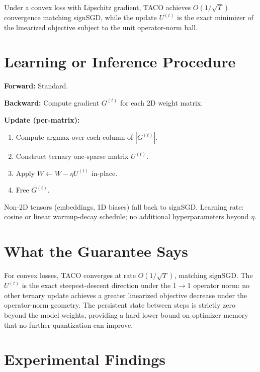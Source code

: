 \documentclass[10pt,twocolumn]{article}
\begin{document}
Under a convex loss with Lipschitz gradient, TACO achieves
$O(1/\sqrt{T})$ convergence matching signSGD, while the update $U^{(t)}$
is the exact minimizer of the linearized objective subject to the unit
operator-norm ball.

\section{Learning or Inference Procedure}

\textbf{Forward:} Standard.

\textbf{Backward:} Compute gradient $G^{(t)}$ for each 2D weight matrix.

\textbf{Update (per-matrix):}
\begin{enumerate}[itemsep=2pt,parsep=0pt]
  \item Compute argmax over each column of $|G^{(t)}|$.
  \item Construct ternary one-sparse matrix $U^{(t)}$.
  \item Apply $W \leftarrow W - \eta U^{(t)}$ in-place.
  \item Free $G^{(t)}$.
\end{enumerate}

Non-2D tensors (embeddings, 1D biases) fall back to signSGD.
Learning rate: cosine or linear warmup-decay schedule; no additional
hyperparameters beyond $\eta$.

\section{What the Guarantee Says}

For convex losses, TACO converges at rate $O(1/\sqrt{T})$, matching signSGD.
The $U^{(t)}$ is the exact steepest-descent direction under the 1$\to$1
operator norm: no other ternary update achieves a greater linearized objective
decrease under the operator-norm geometry. The persistent state between steps
is strictly zero beyond the model weights, providing a hard lower bound on
optimizer memory that no further quantization can improve.

\section{Experimental Findings}
\end{document}
